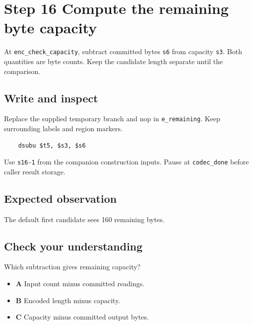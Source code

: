 \section{Step 16 Compute the remaining byte capacity}\label{delta-s16}

At \texttt{enc\_check\_capacity}, subtract committed bytes \texttt{s6} from capacity \texttt{s3}. Both quantities are byte counts. Keep the candidate length separate until the comparison.

\subsection{Write and inspect}
Replace the supplied temporary branch and nop in \texttt{e\_remaining}. Keep surrounding labels and region markers.

\begin{verbatim}
    dsubu $t5, $s3, $s6
\end{verbatim}
Use \texttt{s16-1} from the companion construction inputs. Pause at \texttt{codec\_done} before caller result storage.

\subsection{Expected observation}
The default first candidate sees 160 remaining bytes.

\subsection{Check your understanding}
Which subtraction gives remaining capacity?

\begin{itemize}
\item \textbf{A} Input count minus committed readings.
\item \textbf{B} Encoded length minus capacity.
\item \textbf{C} Capacity minus committed output bytes.
\end{itemize}
